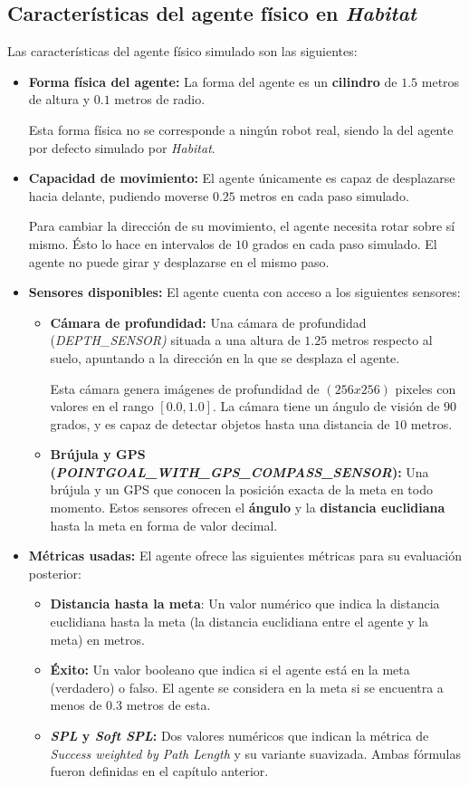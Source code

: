 \subsection{Características del agente físico en \textit{Habitat}}

Las características del agente físico simulado son las siguientes:
\begin{itemize}
	\item \textbf{Forma física del agente:} La forma del agente es un \textbf{cilindro} de $1.5$ metros de altura y $0.1$ metros de radio.
	
	Esta forma física no se corresponde a ningún robot real, siendo la del agente por defecto simulado por \textit{Habitat}.
	\item \textbf{Capacidad de movimiento:} El agente únicamente es capaz de desplazarse hacia delante, pudiendo moverse $0.25$ metros en cada paso simulado.
	
	Para cambiar la dirección de su movimiento, el agente necesita rotar sobre sí mismo. Ésto lo hace en intervalos de $10$ grados en cada paso simulado. El agente no puede girar y desplazarse en el mismo paso.
	\item \textbf{Sensores disponibles:} El agente cuenta con acceso a los siguientes sensores:
	\begin{itemize}
		\item \textbf{Cámara de profundidad:} Una cámara de profundidad (\textit{DEPTH{\_}SENSOR)} situada a una altura de $1.25$ metros respecto al suelo, apuntando a la dirección en la que se desplaza el agente.
		
		Esta cámara genera imágenes de profundidad de $(256x256)$ pixeles con valores en el rango $[0.0, 1.0]$. La cámara tiene un ángulo de visión de $90$ grados, y es capaz de detectar objetos hasta una distancia de $10$ metros.
		\item \textbf{Brújula y GPS (\textit{POINTGOAL{\_}WITH{\_}GPS{\_}COMPASS{\_}SENSOR}):} Una brújula y un GPS que conocen la posición exacta de la meta en todo momento. Estos sensores ofrecen el \textbf{ángulo} y la \textbf{distancia euclidiana} hasta la meta en forma de valor decimal.
	\end{itemize}
	\item \textbf{Métricas usadas:} El agente ofrece las siguientes métricas para su evaluación posterior:
	\begin{itemize}
		\item \textbf{Distancia hasta la meta}: Un valor numérico que indica la distancia euclidiana hasta la meta (la distancia euclidiana entre el agente y la meta) en metros.
		\item \textbf{Éxito:} Un valor booleano que indica si el agente está en la meta (verdadero) o falso. El agente se considera en la meta si se encuentra a menos de $0.3$ metros de esta.
		\item \textbf{\textit{SPL} y \textit{Soft SPL}:} Dos valores numéricos que indican la métrica de \textit{Success weighted by Path Length} \cite{DBLP:journals/corr/abs-1807-06757} y su variante suavizada. Ambas fórmulas fueron definidas en el capítulo anterior.
	\end{itemize}
\end{itemize}

